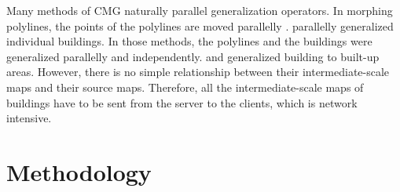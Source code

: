 \documentclass{ica}
\begin{document}
Many methods of CMG naturally parallel generalization operators.
In morphing polylines, the points of the polylines are moved parallelly
\citep[\eg][]{Noellenburg2008,Li2017Annealing}.
\citet{Li2017_Building} parallelly generalized individual buildings.
In those methods, the polylines and the buildings 
were generalized parallelly and independently.
\citet{Peng2017Building} and \citet{Touya2017Progressive}
generalized building to built-up areas.
However, there is no simple relationship 
between their intermediate-scale maps and their source maps.
Therefore, all the intermediate-scale maps of buildings have to be
sent from the server to the clients,
which is network intensive.










%


\section{Methodology}
\label{sec:methodology}


\end{document}
